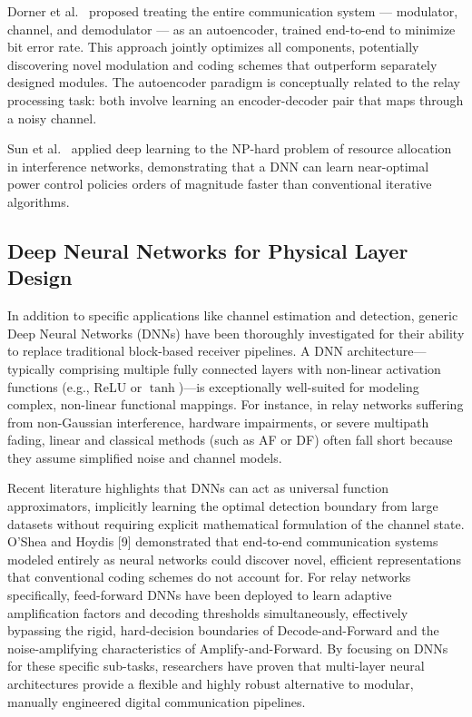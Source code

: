 Dorner et al.~\cite{dorner2018deep} proposed treating the entire communication system --- modulator, channel, and demodulator --- as an autoencoder, trained end-to-end to minimize bit error rate. This approach jointly optimizes all components, potentially discovering novel modulation and coding schemes that outperform separately designed modules. The autoencoder paradigm is conceptually related to the relay processing task: both involve learning an encoder-decoder pair that maps through a noisy channel.

Sun et al.~\cite{sun2018learning} applied deep learning to the NP-hard problem of resource allocation in interference networks, demonstrating that a DNN can learn near-optimal power control policies orders of magnitude faster than conventional iterative algorithms.


\subsection{Deep Neural Networks for Physical Layer Design}

In addition to specific applications like channel estimation and detection, generic Deep Neural Networks (DNNs) have been thoroughly investigated for their ability to replace traditional block-based receiver pipelines. A DNN architecture---typically comprising multiple fully connected layers with non-linear activation functions (e.g., ReLU or $\tanh$)---is exceptionally well-suited for modeling complex, non-linear functional mappings. For instance, in relay networks suffering from non-Gaussian interference, hardware impairments, or severe multipath fading, linear and classical methods (such as AF or DF) often fall short because they assume simplified noise and channel models.

Recent literature highlights that DNNs can act as universal function approximators, implicitly learning the optimal detection boundary from large datasets without requiring explicit mathematical formulation of the channel state. O'Shea and Hoydis [9] demonstrated that end-to-end communication systems modeled entirely as neural networks could discover novel, efficient representations that conventional coding schemes do not account for. For relay networks specifically, feed-forward DNNs have been deployed to learn adaptive amplification factors and decoding thresholds simultaneously, effectively bypassing the rigid, hard-decision boundaries of Decode-and-Forward and the noise-amplifying characteristics of Amplify-and-Forward. By focusing on DNNs for these specific sub-tasks, researchers have proven that multi-layer neural architectures provide a flexible and highly robust alternative to modular, manually engineered digital communication pipelines.


